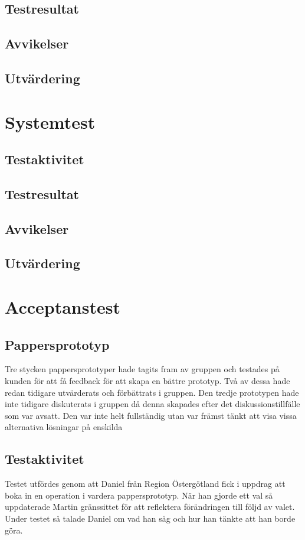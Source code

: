 \documentclass[a4paper,10pt, twoside]{article}
\begin{document}
\subsection{Testresultat}
\subsection{Avvikelser}
\subsection{Utvärdering}
\section{Systemtest}
\subsection{Testaktivitet}
\subsection{Testresultat}
\subsection{Avvikelser}
\subsection{Utvärdering}
\section{Acceptanstest}
\subsection{Pappersprototyp}
Tre stycken pappersprototyper hade tagits fram av gruppen och testades på kunden för att få feedback för att skapa en bättre prototyp. Två av dessa hade redan tidigare utvärderats och förbättrats i gruppen. Den tredje prototypen hade inte tidigare diskuterats i gruppen då denna skapades efter det diskussionstillfälle som var avsatt. Den var inte helt fullständig utan var främst tänkt att visa vissa alternativa lösningar på enskilda
\subsection{Testaktivitet}
Testet utfördes genom att Daniel från Region Östergötland fick i uppdrag att boka in en operation i vardera pappersprototyp. När han gjorde ett val så uppdaterade Martin gränssittet för att reflektera förändringen till följd av valet. Under testet så talade Daniel om vad han såg och hur han tänkte att han borde göra.
\end{document}
